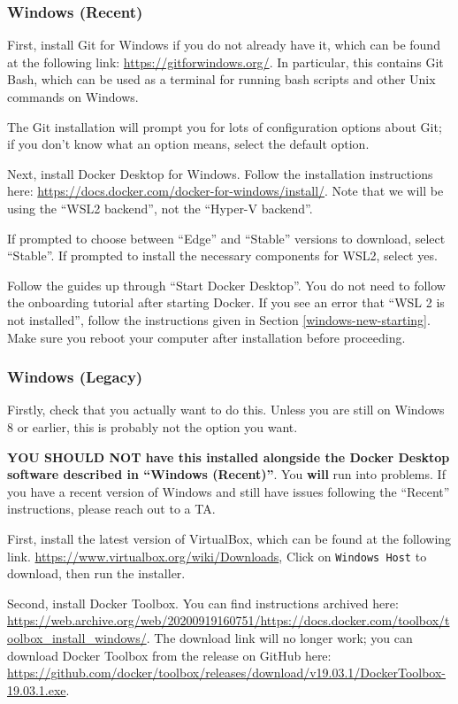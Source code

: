 \subsubsection{Windows (Recent)}\label{windows-new}

First, install Git for Windows if you do not already have it, which can be found at the following link:
\url{https://gitforwindows.org/}. In particular, this contains Git Bash, which can be used as a terminal for running bash scripts and other Unix commands on Windows.

The Git installation will prompt you for lots of configuration options about Git; if you don't know what an option means, select the default option.

Next, install Docker Desktop for Windows. Follow the installation instructions here: \url{https://docs.docker.com/docker-for-windows/install/}. Note that we will be using the ``WSL2 backend'', not the ``Hyper-V backend''.

If prompted to choose between ``Edge'' and ``Stable'' versions to download, select ``Stable''. If prompted to install the necessary components for WSL2, select yes.

Follow the guides up through ``Start Docker Desktop''. You do not need to follow the onboarding tutorial after starting Docker. If you see an error that ``WSL 2 is not installed'', follow the instructions given in Section \ref{windows-new-starting}. Make sure you reboot your computer after installation before proceeding.

\subsubsection{Windows (Legacy)}\label{windows-old}

Firstly, check that you actually want to do this. Unless you are still on Windows 8 or earlier, this is probably not the option you want.

\textbf{YOU SHOULD NOT have this installed alongside the Docker Desktop software described in ``Windows (Recent)''}. You \textbf{will} run into problems. If you have a recent version of Windows and still have issues following the ``Recent'' instructions, please reach out to a TA.

First, install the latest version of VirtualBox, which can be found at the following link.
\url{https://www.virtualbox.org/wiki/Downloads}, Click on \texttt{Windows Host} to download, then run the installer.

Second, install Docker Toolbox. You can find instructions archived here:
\url{https://web.archive.org/web/20200919160751/https://docs.docker.com/toolbox/toolbox_install_windows/}. The download link will no longer work; you can download Docker Toolbox from the release on GitHub here: \url{https://github.com/docker/toolbox/releases/download/v19.03.1/DockerToolbox-19.03.1.exe}.

